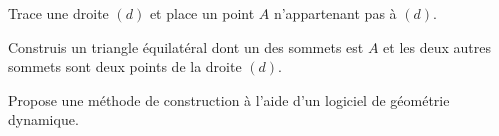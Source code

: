 \begin{enigme}
Trace une droite $(d)$ et place un point $A$ n'appartenant pas à $(d)$.

Construis un triangle équilatéral dont un des sommets est $A$ et les deux autres sommets sont deux points de la droite $(d)$.

Propose une méthode de construction à l'aide d'un logiciel de géométrie dynamique.
\end{enigme}